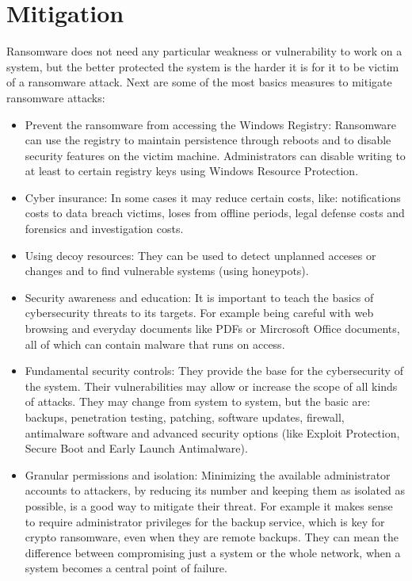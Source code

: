 \section{Mitigation}
Ransomware does not need any particular weakness or vulnerability to work on a system, but the better protected the system is the harder it is for it to be victim of a ransomware attack.
Next are some of the most basics measures to mitigate ransomware attacks\cite{ransomware_oReilly}\cite{ransomware_digital_extortion}\cite{hardening_windows_10}:
\begin{itemize}
	\item Prevent the ransomware from accessing the Windows Registry:
Ransomware can use the registry to maintain persistence through reboots and to disable security features on the victim machine.
Administrators can disable writing to at least to certain registry keys using Windows Resource Protection.
	\item Cyber insurance:
In some cases it may reduce certain costs, like: notifications costs to data breach victims, loses from offline periods, legal defense costs and forensics and investigation costs.
	\item Using decoy resources:
They can be used to detect unplanned acceses or changes and to find vulnerable systems (using honeypots).
	\item Security awareness and education:
It is important to teach the basics of cybersecurity threats to its targets.
For example being careful with web browsing and everyday documents like PDFs or Mircrosoft Office documents, all of which can contain malware that runs on access.
	\item Fundamental security controls:
They provide the base for the cybersecurity of the system.
Their vulnerabilities may allow or increase the scope of all kinds of attacks.
They may change from system to system, but the basic are: backups, penetration testing, patching, software updates, firewall, antimalware software and advanced security options (like Exploit Protection, Secure Boot and Early Launch Antimalware).
	\item Granular permissions and isolation:
Minimizing the available administrator accounts to attackers, by reducing its number and keeping them as isolated as possible, is a good way to mitigate their threat.
For example it makes sense to require administrator privileges for the backup service, which is key for crypto ransomware, even when they are remote backups.
They can mean the difference between compromising just a system or the whole network, when a system becomes a central point of failure.

\end{itemize}
